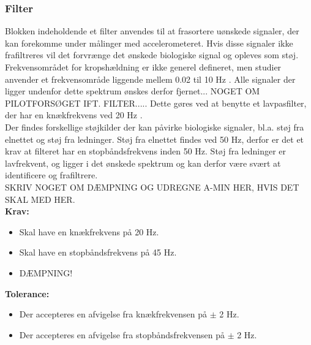 \subsubsection{Filter}
Blokken indeholdende et filter anvendes til at frasortere uønskede signaler, der kan forekomme under målinger med accelerometeret. Hvis disse signaler ikke frafiltreres vil det forvrænge det ønskede biologiske signal og opleves som støj. Frekvensområdet for kropshældning er ikke generel defineret, men studier anvender et frekvensområde liggende mellem 0.02 til 10 Hz \cite{Martinez-Mendez2011}. Alle signaler der ligger undenfor dette spektrum ønskes derfor fjernet... NOGET OM PILOTFORSØGET IFT. FILTER..... Dette gøres ved at benytte et lavpasfilter, der har en knækfrekvens ved 20 Hz . \\
Der findes forskellige støjkilder der kan påvirke biologiske signaler, bl.a. støj fra elnettet og støj fra ledninger. Støj fra elnettet findes ved 50 Hz, derfor er det et krav at filteret har en stopbåndsfrekvens inden 50 Hz. Støj fra ledninger er lavfrekvent, og ligger i det ønskede spektrum og kan derfor være svært at identificere og frafiltrere. \\
SKRIV NOGET OM DÆMPNING OG UDREGNE A-MIN HER, HVIS DET SKAL MED HER.\\
\textbf{Krav:}
\begin{itemize}
\item Skal have en knækfrekvens på 20 Hz.
\item Skal have en stopbåndsfrekvens på 45 Hz.
\item DÆMPNING!
\end{itemize}
\textbf{Tolerance:}
\begin{itemize}
\item Der accepteres en afvigelse fra knækfrekvensen på $\pm$ 2 Hz.
\item Der accepteres en afvigelse fra stopbåndsfrekvensen på $\pm$ 2 Hz.
\end{itemize}
